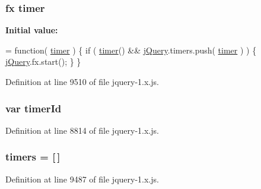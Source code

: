 \subsubsection[{\texorpdfstring{timer}{timer}}]{ {\bf fx} timer}\hypertarget{jquery-1_8x_8js_a2b44b4db680ed005831a801cef9f8bb3}{}\label{jquery-1_8x_8js_a2b44b4db680ed005831a801cef9f8bb3}
{\bfseries Initial value\+:}
\begin{DoxyCode}
= \textcolor{keyword}{function}( \hyperlink{jquery-1_8x_8js_a2b44b4db680ed005831a801cef9f8bb3}{timer} ) \{
    \textcolor{keywordflow}{if} ( \hyperlink{jquery-1_8x_8js_a2b44b4db680ed005831a801cef9f8bb3}{timer}() && \hyperlink{jquery-1_8x_8js_a2b1d6f9c448e3ce72f4e1865d6e38d2c}{jQuery}.timers.push( \hyperlink{jquery-1_8x_8js_a2b44b4db680ed005831a801cef9f8bb3}{timer} ) ) \{
        \hyperlink{jquery-1_8x_8js_a2b1d6f9c448e3ce72f4e1865d6e38d2c}{jQuery}.fx.start();
    \}
\}
\end{DoxyCode}


Definition at line 9510 of file jquery-\/1.\+x.\+js.

\subsubsection[{\texorpdfstring{timer\+Id}{timerId}}]{\setlength{\rightskip}{0pt plus 5cm}var timer\+Id}\hypertarget{jquery-1_8x_8js_aa447439fbe7027e58837a297297c9d8a}{}\label{jquery-1_8x_8js_aa447439fbe7027e58837a297297c9d8a}


Definition at line 8814 of file jquery-\/1.\+x.\+js.

\subsubsection[{\texorpdfstring{timers}{timers}}]{ timers = \mbox{[}$\,$\mbox{]}}\hypertarget{jquery-1_8x_8js_a90bf6571856437dc2269be68a12c1d5a}{}\label{jquery-1_8x_8js_a90bf6571856437dc2269be68a12c1d5a}


Definition at line 9487 of file jquery-\/1.\+x.\+js.

